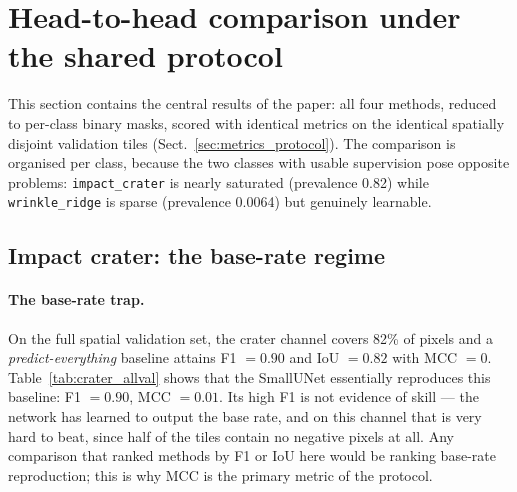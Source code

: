 \section{Head-to-head comparison under the shared protocol}
\label{sec:comparison}

This section contains the central results of the paper: all four methods, reduced to per-class binary masks, scored with identical metrics on the identical spatially disjoint validation tiles (Sect.~\ref{sec:metrics_protocol}). The comparison is organised per class, because the two classes with usable supervision pose opposite problems: \texttt{impact\_crater} is nearly saturated (prevalence 0.82) while \texttt{wrinkle\_ridge} is sparse (prevalence 0.0064) but genuinely learnable.

\subsection{Impact crater: the base-rate regime}
\label{sec:comp_crater}

\paragraph{The base-rate trap.}
On the full spatial validation set, the crater channel covers 82\% of pixels and a \emph{predict-everything} baseline attains F1 $= 0.90$ and IoU $= 0.82$ with MCC $= 0$. Table~\ref{tab:crater_allval} shows that the SmallUNet essentially reproduces this baseline: F1 $= 0.90$, MCC $= 0.01$. Its high F1 is not evidence of skill --- the network has learned to output the base rate, and on this channel that is very hard to beat, since half of the tiles contain no negative pixels at all. Any comparison that ranked methods by F1 or IoU here would be ranking base-rate reproduction; this is why MCC is the primary metric of the protocol.

\begin{table}[htbp]
\centering
\caption{Impact crater, full spatial validation set (per-method calibrated threshold $\tau$). The predict-all row is the trivial baseline that labels every pixel crater. MCC is the primary ranking metric; F1/IoU are dominated by the 0.82 base rate.}
\label{tab:crater_allval}
\end{table}

